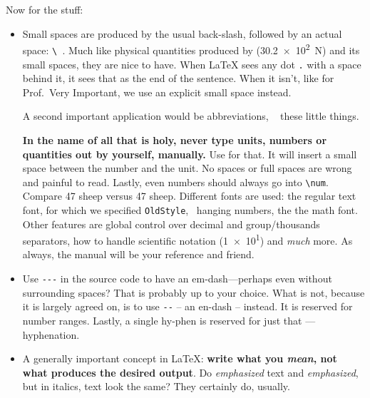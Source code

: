 Now for the stuff:
\begin{itemize}
	\item Small spaces are produced by the usual back-slash, followed by an actual space: \verb|\ |.
	Much like physical quantities produced by  (\SI{30.2e2}{\newton}) and its small spaces, they are nice to have.
	When \LaTeX{} sees any dot \verb|.| with a space behind it, it sees that as the end of the sentence.
	When it isn't, like for Prof.\ Very Important, we use an explicit small space instead.
	
	A second important application would be abbreviations, \ \textleftarrow{} these little things.
	
	\textbf{In the name of all that is holy, never type units, numbers or quantities out by yourself, manually.}
	Use  for that.
	It will insert a small space between the number and the unit.
	No spaces or full spaces are wrong and painful to read.
	Lastly, even numbers should always go into \verb|\num|.
	Compare 47 sheep versus \num{47} sheep.
	Different fonts are used: the regular text font, for which we specified \verb|OldStyle|, \ hanging numbers, the the math font.
	Other features are global control over decimal and group/thousands separators, how to handle scientific notation (\num{1e1}) and \emph{much} more.
	As always, the manual will be your reference and friend.
	\item Use \verb|---| in the source code to have an em-dash---perhaps even without surrounding spaces?
	That is probably up to your choice.
	What is not, because it is largely agreed on, is to use \verb|--| -- an en-dash -- instead.
	It is reserved for number ranges.
	Lastly, a single hy-phen is reserved for just that --- hyphenation.
	\item A generally important concept in \LaTeX{}:
	\textbf{write what you \emph{mean}, not what produces the desired output}.
	Do \emph{emphasized} text and \textit{emphasized}, but in italics, text look the same?
	They certainly do, usually.
	

\end{itemize}
